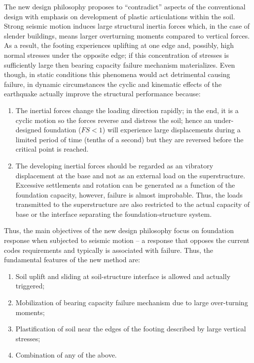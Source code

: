 \documentclass[12pt,a4paper]{report}
\begin{document}
The new design philosophy proposes to “contradict” aspects of the conventional design with emphasis on development of plastic articulations within the soil. Strong seismic motion induces large structural inertia forces which, in the case of slender buildings, means larger overturning moments compared to vertical forces. As a result, the footing experiences uplifting at one edge and, possibly, high normal stresses under the opposite edge; if this concentration of stresses is sufficiently large then bearing capacity failure mechanism materializes. Even though, in static conditions this phenomena would act detrimental causing failure, in dynamic circumstances the cyclic and kinematic effects of the earthquake actually improve the structural performance because:
\begin{enumerate}
	\item The inertial forces change the loading direction rapidly; in the end, it is a cyclic motion so the forces reverse and distress the soil; hence an under-designed foundation ($FS<1$) will experience large displacements during a limited period of time (tenths of a second) but they are reversed before the critical point is reached.
	\item The developing inertial forces should be regarded as an vibratory displacement at the base and not as an external load on the superstructure. Excessive settlements and rotation can be generated as a function of the foundation capacity, however, failure is almost improbable. Thus, the loads transmitted to the superstructure are also restricted to the actual capacity of base or the interface separating the foundation-structure system.
\end{enumerate}

Thus, the main objectives of the new design philosophy focus on foundation response when subjected to seismic motion – a response that opposes the current codes requirements and typically is associated with failure. Thus, the fundamental features of the new method are: 
\begin{enumerate}
	\item Soil uplift and sliding at soil-structure interface is allowed and actually triggered;
	\item Mobilization of bearing capacity failure mechanism due to large over-turning moments;
	\item Plastification of soil near the edges of the footing described by large vertical stresses; 
	\item Combination of any of the above.
\end{enumerate}
\end{document}
